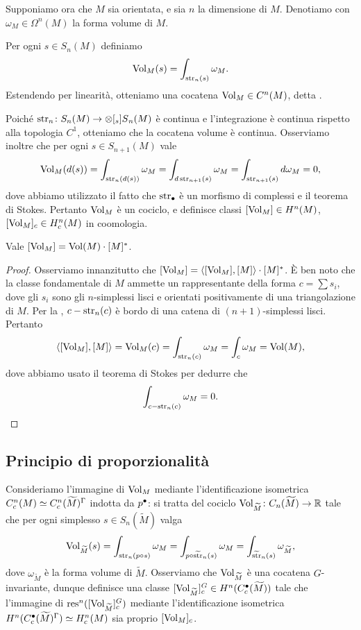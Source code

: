 Supponiamo ora che $M$ sia orientata, e sia $n$ la dimensione di $M$. Denotiamo con $\omega_M\in\Omega^n(M)$ la forma volume di $M$.
\begin{definition}
Per ogni $s\in S_n(M)$ definiamo
\[
\operatorname{Vol}_M(s)=\int_{\operatorname{str}_n(s)}\omega_M.
\]
Estendendo per linearità, otteniamo una cocatena $\operatorname{Vol}_M\in C^n(M)$, detta .
\end{definition}
Poiché $\map{\str_n}{S_n(M)}{\prepost[_s]{S}{_n}(M)}$ è continua e l'integrazione è continua rispetto alla topologia $C^1$, otteniamo che la cocatena volume è continua. Osserviamo inoltre che per ogni $s\in S_{n+1}(M)$ vale
\[
\operatorname{Vol}_M(d(s))=\int_{\operatorname{str}_n(d(s))}\omega_M=\int_{d\operatorname{str}_{n+1}(s)}\omega_M=\int_{\operatorname{str}_{n+1}(s)}d\omega_M=0,
\]
dove abbiamo utilizzato il fatto che $\operatorname{str}_\bullet$ è un morfismo di complessi e il teorema di Stokes. Pertanto $\operatorname{Vol}_M$ è un cociclo, e definisce classi $[\operatorname{Vol}_M]\in H^n(M)$, $[\operatorname{Vol}_M]_c\in H^n_c(M)$ in coomologia.

\begin{lemma}
Vale $[\operatorname{Vol}_M]=\operatorname{Vol}(M)\cdot[M]^*$.
\end{lemma}
\begin{proof}
Osserviamo innanzitutto che $[\operatorname{Vol}_M]=\langle[\operatorname{Vol}_M],[M]\rangle\cdot[M]^*$. È ben noto che la classe fondamentale di $M$ ammette un rappresentante della forma $c=\sum s_i$, dove gli $s_i$ sono gli $n$-simplessi lisci e orientati positivamente di una triangolazione di $M$. Per la , $c-\operatorname{str}_n(c)$ è bordo di una catena di $(n+1)$-simplessi lisci. Pertanto
\[
\langle[\operatorname{Vol}_M],[M]\rangle=\operatorname{Vol}_M(c)=\int_{\operatorname{str}_n(c)}\omega_M=\int_{c}\omega_M=\operatorname{Vol}(M),
\]
dove abbiamo usato il teorema di Stokes per dedurre che
\[
\int_{c-\operatorname{str}_n(c)}\omega_M=0.\qedhere
\]
\end{proof}

\subsection{Principio di proporzionalità}

Consideriamo l'immagine di $\operatorname{Vol}_M$ mediante l'identificazione isometrica $C^n_c(M)\simeq C^n_c(\widetilde M)^\Gamma$ indotta da $p^\bullet$: si tratta del cociclo $\map{\Vol_{\widetilde M}}{C_n(\widetilde M)}{\RR}$ tale che per ogni simplesso $s\in S_n(\widetilde M)$ valga
\[
\operatorname{Vol}_{\widetilde M}(s)=\int_{\operatorname{str}_n(p\circ s)}\omega_M=\int_{p\circ\widetilde{\operatorname{str}}_n(s)}\omega_M=\int_{\widetilde{\operatorname{str}}_n(s)}\omega_{\widetilde M},
\]
dove $\omega_{\widetilde M}$ è la forma volume di $\widetilde M$. Osserviamo che $\operatorname{Vol}_{\widetilde M}$ è una cocatena $G$-invariante, dunque definisce una classe $[\operatorname{Vol}_{\widetilde M}]^G_c\in H^n(C^\bullet_c(\widetilde M))$ tale che l'immagine di $\operatorname{res}^n([\operatorname{Vol}_{\widetilde M}]^G_c)$ mediante l'identificazione isometrica $H^n(C^\bullet_c(\widetilde M)^\Gamma)\simeq H^n_c(M)$ sia proprio $[\operatorname{Vol}_M]_c$.

